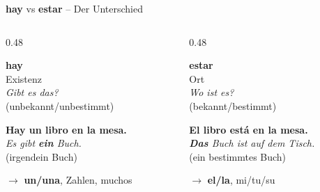 \documentclass[aspectratio=169, 11pt]{beamer}
\newcommand{\es}[1]{\textbf{\textcolor{spanischrot}{#1}}}
\newcommand{\de}[1]{{\small\textcolor{dunkelgrau}{\textit{#1}}}}
\newcommand{\estar}[1]{\textbf{\textcolor{blau}{#1}}}
\begin{document}
\begin{frame}{\es{hay} vs \estar{estar} -- Der Unterschied}

\begin{columns}[T]
\begin{column}{0.48\textwidth}
\begin{center}
{\Large\bfseries\textcolor{spanischrot}{hay}}\\[0.3cm]
{\large Existenz}\\[0.5em]
\de{Gibt es das?}\\[0.5em]
(unbekannt/unbestimmt)
\end{center}

\vspace{0.5cm}

\es{Hay \textbf{un} libro en la mesa.}\\[0.3em]
\de{Es gibt \textbf{ein} Buch.}\\[0.3em]
{\small (irgendein Buch)}

\vspace{0.5cm}

$\rightarrow$ \textbf{un/una}, Zahlen, muchos
\end{column}

\begin{column}{0.48\textwidth}
\begin{center}
{\Large\bfseries\textcolor{blau}{estar}}\\[0.3cm]
{\large Ort}\\[0.5em]
\de{Wo ist es?}\\[0.5em]
(bekannt/bestimmt)
\end{center}

\vspace{0.5cm}

\estar{\textbf{El} libro está en la mesa.}\\[0.3em]
\de{\textbf{Das} Buch ist auf dem Tisch.}\\[0.3em]
{\small (ein bestimmtes Buch)}

\vspace{0.5cm}

$\rightarrow$ \textbf{el/la}, mi/tu/su
\end{column}
\end{columns}

\end{frame}
\end{document}
